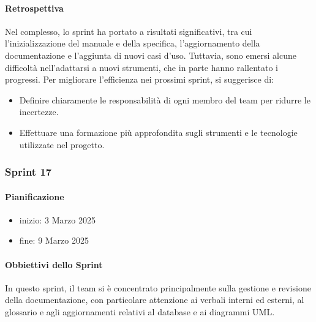 \documentclass{article}
\begin{document}
            \paragraph{Retrospettiva}
            Nel complesso, lo sprint ha portato a risultati significativi, tra cui l'inizializzazione del manuale e della specifica, l'aggiornamento della documentazione e l'aggiunta di nuovi casi d'uso. Tuttavia, sono emersi alcune difficoltà nell'adattarsi a nuovi strumenti, che in parte hanno rallentato i progressi. Per migliorare l'efficienza nei prossimi sprint, si suggerisce di:
            \begin{itemize}
                \item Definire chiaramente le responsabilità di ogni membro del team per ridurre le incertezze.
                \item Effettuare una formazione più approfondita sugli strumenti e le tecnologie utilizzate nel progetto.
            \end{itemize}
                
                
            \subsubsection{Sprint 17}
            \paragraph{Pianificazione}
                \begin{itemize}
                    \item inizio: 3 Marzo 2025
                    \item fine: 9 Marzo 2025
                \end{itemize}
            
            \paragraph{Obbiettivi dello Sprint}
            In questo sprint, il team si è concentrato principalmente sulla gestione e revisione della documentazione, con particolare attenzione ai verbali interni ed esterni, al glossario e agli aggiornamenti relativi al database e ai diagrammi UML.
            
\end{document}
